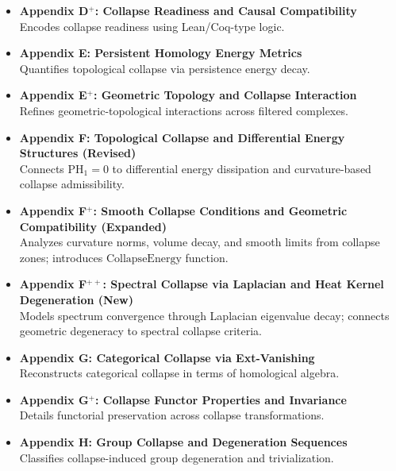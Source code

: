 \documentclass[11pt]{article}
\begin{document}
\begin{itemize}
  \item \textbf{Appendix D$^+$: Collapse Readiness and Causal Compatibility} \\
  Encodes collapse readiness using Lean/Coq-type logic.

  \item \textbf{Appendix E: Persistent Homology Energy Metrics} \\
  Quantifies topological collapse via persistence energy decay.

  \item \textbf{Appendix E$^+$: Geometric Topology and Collapse Interaction} \\
  Refines geometric-topological interactions across filtered complexes.

  \item \textbf{Appendix F: Topological Collapse and Differential Energy Structures (Revised)} \\
  Connects $\mathrm{PH}_1 = 0$ to differential energy dissipation and curvature-based collapse admissibility.

  \item \textbf{Appendix F$^+$: Smooth Collapse Conditions and Geometric Compatibility (Expanded)} \\
  Analyzes curvature norms, volume decay, and smooth limits from collapse zones; introduces $\mathrm{CollapseEnergy}$ function.

  \item \textbf{Appendix F$^{++}$: Spectral Collapse via Laplacian and Heat Kernel Degeneration (New)} \\
  Models spectrum convergence through Laplacian eigenvalue decay; connects geometric degeneracy to spectral collapse criteria.

  \item \textbf{Appendix G: Categorical Collapse via Ext-Vanishing} \\
  Reconstructs categorical collapse in terms of homological algebra.

  \item \textbf{Appendix G$^+$: Collapse Functor Properties and Invariance} \\
  Details functorial preservation across collapse transformations.

  \item \textbf{Appendix H: Group Collapse and Degeneration Sequences} \\
  Classifies collapse-induced group degeneration and trivialization.


\end{itemize}
\end{document}

